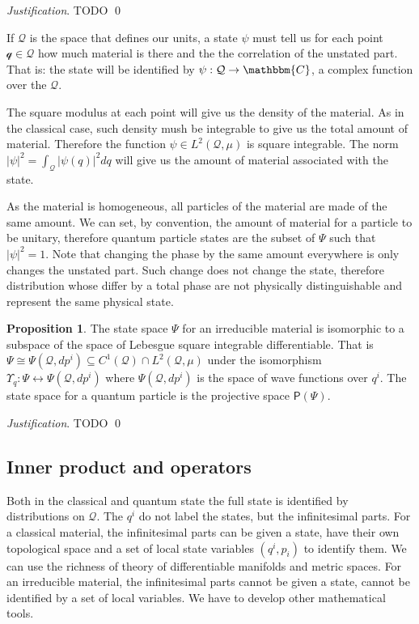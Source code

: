 \documentclass[aps,pra,10pt,twocolumn,floatfix,nofootinbib]{revtex4-1}
\numberwithin{equation}{section}
\theoremstyle{definition}
\newtheorem{prop}[equation]{Proposition}
\newenvironment{justification}{\emph{Justification}.}{\qed}
\begin{document}
\begin{justification}
	TODO
\end{justification}

If $\mathcal{Q}$ is the space that defines our units, a state $\psi$ must tell us for each point $\mathcal{q} \in \mathcal{Q}$ how much material is there and the the correlation of the unstated part. That is: the state will be identified by $\psi : \mathcal{Q} \rightarrow \mathbbm{C}$, a complex function over the $\mathcal{Q}$.

The square modulus at each point will give us the density of the material. As in the classical case, such density mush be integrable to give us the total amount of material. Therefore the function $\psi \in L^2(\mathcal{Q}, \mu)$ is square integrable. The norm $|\psi|^2 = \int_{\mathcal{Q}} |\psi(q)|^2 dq$ will give us the amount of material associated with the state.

As the material is homogeneous, all particles of the material are made of the same amount. We can set, by convention, the amount of material for a particle to be unitary, therefore quantum particle states are the subset of $\Psi$ such that $|\psi|^2 = 1$. Note that changing the phase by the same amount everywhere is only changes the unstated part. Such change does not change the state, therefore distribution whose differ by a total phase are not physically distinguishable and represent the same physical state.

\begin{prop}\label{prop:wavefuntion}
	The state space $\Psi$ for an irreducible material is isomorphic to a subspace of the space of Lebesgue square integrable differentiable. That is $\Psi \cong \Psi(\mathcal{Q}, dp^i) \subseteq C^1(\mathcal{Q}) \cap L^2(\mathcal{Q}, \mu)$ under the isomorphism $\Upsilon_q : \Psi \leftrightarrow \Psi(\mathcal{Q}, dp^i)$ where $\Psi(\mathcal{Q}, dp^i)$ is the space of wave functions over $q^i$. The state space for a quantum particle is the projective space $\mathsf{P}(\Psi)$.
\end{prop}
\begin{justification}
	TODO
\end{justification}

\subsection{Inner product and operators}

Both in the classical and quantum state the full state is identified by distributions on $\mathcal{Q}$. The $q^i$ do not label the states, but the infinitesimal parts. For a classical material, the infinitesimal parts can be given a state, have their own topological space and a set of local state variables $(q^i, p_i)$ to identify them. We can use the richness of theory of differentiable manifolds and metric spaces. For an irreducible material, the infinitesimal parts cannot be given a state, cannot be identified by a set of local variables. We have to develop other mathematical tools.
\end{document}
